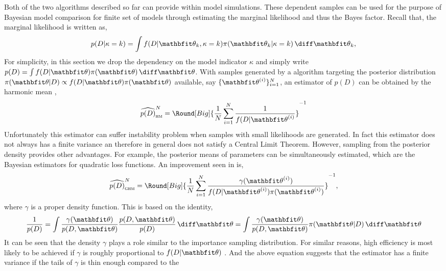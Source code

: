 Both of the two algorithms described so far can provide within model
simulations. These dependent samples can be used for the purpose of Bayesian
model comparison for finite set of models through estimating the marginal
likelihood and thus the Bayes factor. Recall that, the marginal likelihood is
written as,
\begin{equation*}
  p(D|\kappa = k) = \int f(D|\bth_k,\kappa=k)\pi(\bth_k|\kappa=k)\intd\bth_k,
  \label{eq:marginal likelihood}
\end{equation*}
For simplicity, in this section we drop the dependency on the model indicator
$\kappa$ and simply write $p(D) = \int f(D|\bth)\pi(\bth)\intd\bth$.  With
samples generated by a \mcmc algorithm targeting the posterior distribution
$\pi(\bth|D) \propto f(D|\bth) \pi(\bth)$ available, say $\{\bthiu\}_{i=1}^N$,
an estimator of $p(D)$ can be obtained by the harmonic mean
\parencite{Newton:1994wm},
\begin{equation}
  \widehat{p(D)}_{\text{\textsc{hm}}}^N =
  \Round[Big]{\frac{1}{N}\sum_{i=1}^N\frac{1}{f(D|\bthiu}}^{-1}
\end{equation}
Unfortunately this estimator can suffer instability problem when samples with
small likelihoods are generated. In fact this estimator does not always has a
finite variance an therefore in general does not satisfy a Central Limit
Theorem. However, sampling from the posterior density provides other
advantages. For example, the posterior means of parameters can be
simultaneously estimated, which are the Bayesian estimators for quadratic loss
functions. An improvement seen in \textcite{Kass:1995vb} is,
\begin{equation}
  \widehat{p(D)}_{\text{\textsc{ghm}}}^N = \Round[Big]{
    \frac{1}{N}\sum_{i=1}^N\frac{\gamma(\bthiu)}{f(D|\bthiu)\pi(\bthiu)}}^{-1},
\end{equation}
where $\gamma$ is a proper density function. This is based on the identity,
\begin{equation}
  \frac{1}{p(D)}
  = \int \frac{\gamma(\bth)}{p(D,\bth)} \frac{p(D,\bth)}{p(D)} \intd \bth
  = \int \frac{\gamma(\bth)}{p(D,\bth)} \pi(\bth|D) \intd \bth
\end{equation}
It can be seen that the density $\gamma$ plays a role similar to the
importance sampling distribution. For similar reasons, high efficiency is most
likely to be achieved if $\gamma$ is roughly proportional to $f(D|\bth)$
\parencite{Kass:1995vb}. And the above equation suggests that the estimator
has a finite variance if the tails of $\gamma$ is thin enough compared to the
